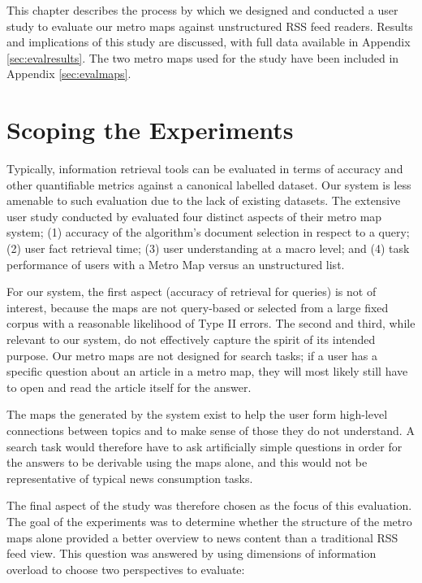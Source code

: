 This chapter describes the process by which we designed and conducted a user study to evaluate our metro maps against unstructured RSS feed readers. Results and implications of this study are discussed, with full data available in Appendix \ref{sec:evalresults}. The two metro maps used for the study have been included in Appendix  \ref{sec:evalmaps}.

\section{Scoping the Experiments}

Typically, information retrieval tools can be evaluated in terms of  accuracy and other quantifiable metrics against a canonical labelled dataset. Our system is less amenable to such evaluation due to the lack of existing datasets. The extensive user study conducted by \cite{GeneratingInformationMaps} evaluated four distinct aspects of their metro map system; (1) accuracy of the algorithm's document selection in respect to a query; (2) user fact retrieval time; (3) user understanding at a macro level; and (4) task performance of users with a Metro Map versus an unstructured list.

For our system, the first aspect (accuracy of retrieval for queries) is not of interest, because the maps are not query-based or selected from a large fixed corpus with a reasonable likelihood of Type II errors. The second and third, while relevant to our system, do not effectively capture the spirit of its intended purpose. Our metro maps are not designed for search tasks; if a user has a specific question about an article in a metro map, they will most likely still have to open and read the article itself for the answer. 

The maps the generated by the system exist to help the user form high-level connections between topics and to make sense of those they do not understand. A search task would therefore have to ask artificially simple questions in order for the answers to be derivable using the maps alone, and this would not be representative of typical news consumption tasks.

The final aspect of the \citeauthor{GeneratingInformationMaps} study was therefore chosen as the focus of this evaluation. The goal of the experiments was to determine whether the structure of the metro maps alone provided a better overview to news content than a traditional RSS feed view. This question was answered by using  dimensions of information overload to choose two perspectives to evaluate:

